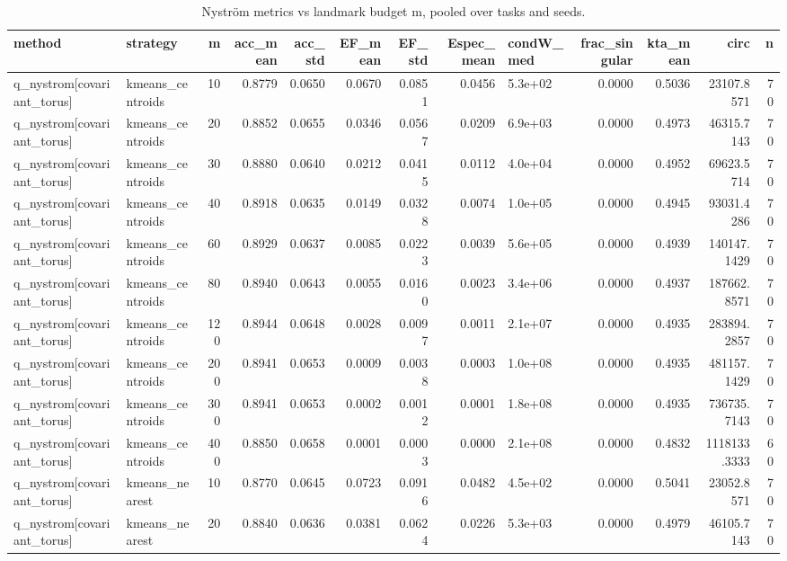 \begin{table}
\caption{Nyström metrics vs landmark budget m, pooled over tasks and seeds.}
\label{tab:table_vs_m_pooled}
\begin{tabular}{llrrrrrrlrrrr}
\toprule
method & strategy & m & acc\_mean & acc\_std & EF\_mean & EF\_std & Espec\_mean & condW\_med & frac\_singular & kta\_mean & circ & n \\
\midrule
q\_nystrom[covariant\_torus] & kmeans\_centroids & 10 & 0.8779 & 0.0650 & 0.0670 & 0.0851 & 0.0456 & 5.3e+02 & 0.0000 & 0.5036 & 23107.8571 & 70 \\
q\_nystrom[covariant\_torus] & kmeans\_centroids & 20 & 0.8852 & 0.0655 & 0.0346 & 0.0567 & 0.0209 & 6.9e+03 & 0.0000 & 0.4973 & 46315.7143 & 70 \\
q\_nystrom[covariant\_torus] & kmeans\_centroids & 30 & 0.8880 & 0.0640 & 0.0212 & 0.0415 & 0.0112 & 4.0e+04 & 0.0000 & 0.4952 & 69623.5714 & 70 \\
q\_nystrom[covariant\_torus] & kmeans\_centroids & 40 & 0.8918 & 0.0635 & 0.0149 & 0.0328 & 0.0074 & 1.0e+05 & 0.0000 & 0.4945 & 93031.4286 & 70 \\
q\_nystrom[covariant\_torus] & kmeans\_centroids & 60 & 0.8929 & 0.0637 & 0.0085 & 0.0223 & 0.0039 & 5.6e+05 & 0.0000 & 0.4939 & 140147.1429 & 70 \\
q\_nystrom[covariant\_torus] & kmeans\_centroids & 80 & 0.8940 & 0.0643 & 0.0055 & 0.0160 & 0.0023 & 3.4e+06 & 0.0000 & 0.4937 & 187662.8571 & 70 \\
q\_nystrom[covariant\_torus] & kmeans\_centroids & 120 & 0.8944 & 0.0648 & 0.0028 & 0.0097 & 0.0011 & 2.1e+07 & 0.0000 & 0.4935 & 283894.2857 & 70 \\
q\_nystrom[covariant\_torus] & kmeans\_centroids & 200 & 0.8941 & 0.0653 & 0.0009 & 0.0038 & 0.0003 & 1.0e+08 & 0.0000 & 0.4935 & 481157.1429 & 70 \\
q\_nystrom[covariant\_torus] & kmeans\_centroids & 300 & 0.8941 & 0.0653 & 0.0002 & 0.0012 & 0.0001 & 1.8e+08 & 0.0000 & 0.4935 & 736735.7143 & 70 \\
q\_nystrom[covariant\_torus] & kmeans\_centroids & 400 & 0.8850 & 0.0658 & 0.0001 & 0.0003 & 0.0000 & 2.1e+08 & 0.0000 & 0.4832 & 1118133.3333 & 60 \\
q\_nystrom[covariant\_torus] & kmeans\_nearest & 10 & 0.8770 & 0.0645 & 0.0723 & 0.0916 & 0.0482 & 4.5e+02 & 0.0000 & 0.5041 & 23052.8571 & 70 \\
q\_nystrom[covariant\_torus] & kmeans\_nearest & 20 & 0.8840 & 0.0636 & 0.0381 & 0.0624 & 0.0226 & 5.3e+03 & 0.0000 & 0.4979 & 46105.7143 & 70 \\

\end{tabular}
\end{table}
